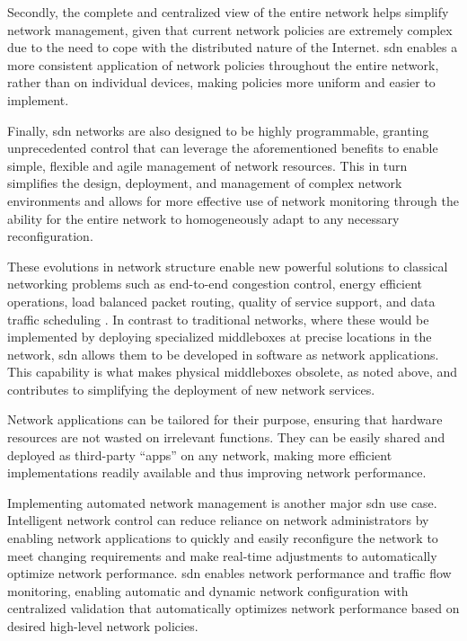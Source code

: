Secondly, the complete and centralized view of the entire network helps simplify network management\cite{bifulco_survey_2018}, given that current network policies are extremely complex due to the need to cope with the distributed nature of the Internet. \gls{sdn} enables a more consistent application of network policies throughout the entire network, rather than on individual devices, making policies more uniform and easier to implement.   \cite{nunes_survey_2014}

Finally, \gls{sdn} networks are also designed to be highly programmable, granting unprecedented control that can leverage the aforementioned benefits to enable simple, flexible and agile management of network resources. This in turn simplifies the design, deployment, and management of complex network environments and allows for more effective use of network monitoring through the ability for the entire network to homogeneously adapt to any necessary reconfiguration.

These evolutions in network structure enable new powerful solutions to classical networking problems such as end-to-end congestion control, energy efficient operations, load balanced packet routing, quality of service support, and data traffic scheduling \cite{xia_survey_2015}. In contrast to traditional networks, where these would be implemented by deploying specialized middleboxes at precise locations in the network, \gls{sdn} allows them to be developed in software as network applications. This capability is what makes physical middleboxes obsolete, as noted above, and contributes to simplifying the deployment of new network services.

Network applications can be tailored for their purpose, ensuring that hardware resources are not wasted on irrelevant functions\cite{bifulco_survey_2018}. They can be easily shared and deployed as third-party “apps” on any network\cite{nunes_survey_2014}\cite{kreutz_software-defined_2015}, making more efficient implementations readily available and thus improving network performance. 

Implementing automated network management is another major \gls{sdn} use case. Intelligent network control can reduce reliance on network administrators by enabling network applications to quickly and easily reconfigure the network to meet changing requirements and make real-time adjustments to automatically optimize network performance. \gls{sdn} enables network performance and traffic flow monitoring, enabling automatic and dynamic network configuration with centralized validation that automatically optimizes network performance based on desired high-level network policies. \cite{xia_survey_2015} \cite{li_protocol_2017} \cite{xia_survey_2015}

